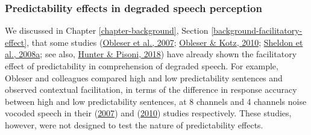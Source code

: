 \documentclass[a4paper, nobind]{templates/ociamthesis}
\begin{document}
\hypertarget{predictability-effects-in-degraded-speech-perception}{%
\subsubsection{Predictability effects in degraded speech perception}\label{predictability-effects-in-degraded-speech-perception}}

\noindent
We discussed in Chapter \ref{chapter-background}, Section \ref{background-facilitatory-effect},
that some studies (\protect\hyperlink{ref-Obleser2007}{Obleser et al., 2007}; \protect\hyperlink{ref-Obleser2010}{Obleser \& Kotz, 2010}; \protect\hyperlink{ref-Sheldon2008a}{Sheldon et al., 2008a}; see also, \protect\hyperlink{ref-Hunter2018}{Hunter \& Pisoni, 2018}) have already shown the facilitatory effect of predictability in comprehension of degraded speech.
For example, Obleser and colleagues compared high and low predictability sentences and observed contextual facilitation, in terms of the difference in response accuracy between high and low predictability sentences, at 8 channels and 4 channels noise vocoded speech in their (\protect\hyperlink{ref-Obleser2007}{2007}) and (\protect\hyperlink{ref-Obleser2010}{2010}) studies respectively.
These studies, however, were not designed to test the nature of predictability effects.
\end{document}
